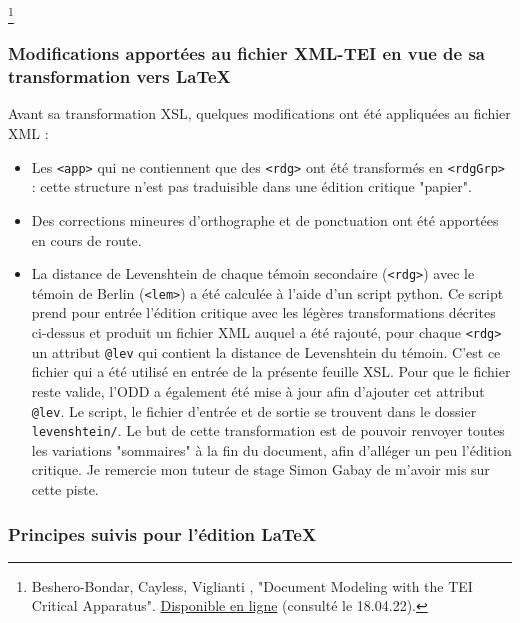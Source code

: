 \documentclass[12pt, a4paper]{article}
\begin{document}
	\footnote{
		Beshero-Bondar, Cayless, Viglianti
		, "Document Modeling with the TEI Critical Apparatus". \href{http://bit.ly/crit-app-panel}{Disponible en ligne} (consulté le 18.04.22).}
	\subsubsection{Modifications apportées au fichier XML-TEI en vue de 
		sa transformation vers \LaTeX}
	
	Avant sa transformation XSL, quelques modifications ont été appliquées
	au fichier XML :
	\begin{itemize}
		\item{Les \texttt{<app>} qui ne contiennent que des 
			\texttt{<rdg>} ont été transformés en \texttt{<rdgGrp>} :
			cette structure n'est pas traduisible dans une édition critique "papier".}
		\item{Des corrections mineures d'orthographe et de ponctuation ont été 
			apportées en cours de route.}
		\item{La distance de Levenshtein de chaque témoin secondaire 
			(\texttt{<rdg>}) avec le témoin de Berlin (\texttt{<lem>}) a été
			calculée à l'aide d'un script python. Ce script prend pour entrée l'édition
			critique avec les légères transformations décrites ci-dessus et produit un 
			fichier XML auquel a été rajouté, pour chaque \texttt{<rdg>} un attribut
			\texttt{@lev} qui contient la distance de Levenshtein du témoin. C'est ce fichier
			qui a été utilisé en entrée de la présente feuille XSL. Pour que le fichier
			reste valide, l'ODD a également été mise à jour afin d'ajouter cet attribut 
			\texttt{@lev}. Le script, le fichier d'entrée et de sortie se trouvent dans
			le dossier \texttt{levenshtein/}. Le but de cette transformation est de pouvoir renvoyer
			toutes les variations "sommaires" à la fin du document, afin d'alléger
			un peu l'édition critique. Je remercie mon tuteur de stage Simon Gabay
			de m'avoir mis sur cette piste.}
	\end{itemize}
	
	\subsubsection{Principes suivis pour l'édition \LaTeX}
	
\end{document}

